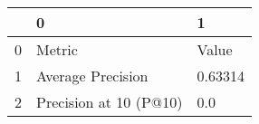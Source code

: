 \begin{tabular}{lll}
\toprule
{} &                       0 &        1 \\
\midrule
0 &                  Metric &    Value \\
1 &       Average Precision &  0.63314 \\
2 &  Precision at 10 (P@10) &      0.0 \\
\bottomrule
\end{tabular}
